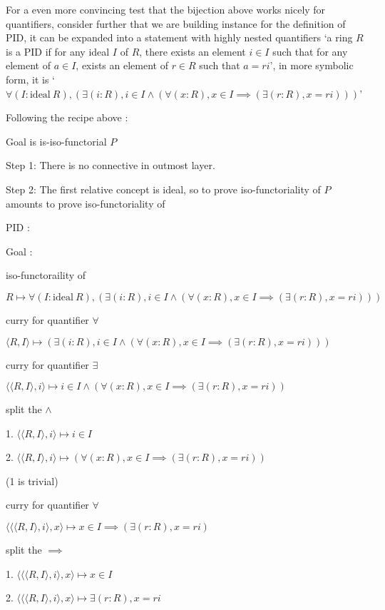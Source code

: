 \documentclass[11pt]{article}
\begin{document}
For a even more convincing test that the bijection above works nicely for quantifiers, consider further that we are building instance for the definition of PID, it can be expanded into a statement with highly nested quantifiers `a ring $R$ is a PID if for any ideal $I$ of $R$, there exists an element $i\in I$ such that for any element of $a\in I$, exists an element of $r\in R$ such that $a= ri$', in more symbolic form, it is `$\forall (I : \text{ideal} \ R), (\exists (i : R), i\in I \land (\forall (x : R), x \in I\implies (\exists (r : R), x = ri)))$'

Following the recipe above :

Goal is is-iso-functorial $P$

Step 1: There is no connective in outmost layer.

Step 2: The first relative concept is ideal, so to prove iso-functoriality of $P$ amounts to prove iso-functoriality of

PID : 

Goal : 

iso-functoraility of 

$R\mapsto \forall (I : \text{ideal} \ R), (\exists (i : R), i\in I \land (\forall (x : R), x \in I\implies (\exists (r : R), x = ri)))$

curry for quantifier $\forall$

$\langle R,I\rangle \mapsto (\exists (i : R), i\in I \land (\forall (x : R), x \in I\implies (\exists (r : R), x = ri)))$

curry for quantifier $\exists$

$\langle \langle R,I\rangle,i\rangle \mapsto i\in I \land (\forall (x : R), x \in I\implies (\exists (r : R), x = ri))$

split the $\land$

1. $\langle \langle R,I\rangle,i\rangle \mapsto i\in I$

2. $\langle \langle R,I\rangle,i\rangle\mapsto (\forall (x : R), x \in I\implies (\exists (r : R), x = ri))$

(1 is trivial)

curry for quantifier $\forall$

$\langle \langle \langle R,I\rangle,i\rangle,x\rangle\mapsto x \in I\implies (\exists (r : R), x = ri)$

split the $\implies$

1. $\langle \langle \langle R,I\rangle,i\rangle,x\rangle\mapsto x \in I$

2. $\langle \langle \langle R,I\rangle,i\rangle,x\rangle\mapsto \exists (r : R), x = ri$
\end{document}
